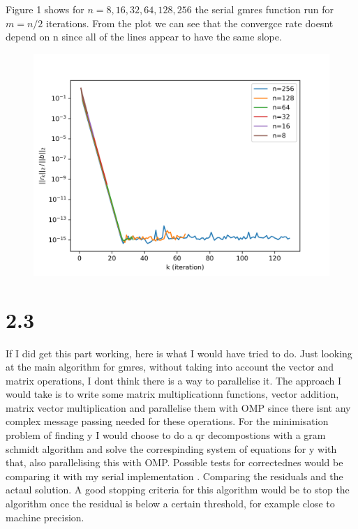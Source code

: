 \documentclass[a4paper]{article}
\begin{document}
	Figure 1 shows for $n = 8, 16, 32, 64, 128, 256$ the serial gmres function run
	for $m = n/2$ iterations. From the plot we can see that the convergce rate doesnt depend on n
	since all of the lines appear to have the same slope.
	\begin{figure}[h!]
	    \centering
    	\includegraphics[width=.8\linewidth]{./q2_fig.png}
		\caption{}
    	\label{fig:q2_fig}
	\end{figure}

\section*{2.3}
		
	If I did get this part working, here is what I would have tried to do. Just looking at the
	main algorithm for gmres, without taking into account the vector and matrix operations, I dont
	think there is a way to parallelise it. The approach I would take is to write some matrix 
	multiplicationn functions, vector addition, matrix vector multiplication and parallelise them 
	with OMP since there isnt any complex message passing needed for these operations. For the 
	minimisation problem of finding y I would choose to do a qr decompostions with a gram schmidt 
	algorithm and solve the correspinding system of equations for y with that, also parallelising 
	this with OMP. Possible tests for correctednes would be comparing it with my serial implementation
	. Comparing the residuals and the actaul solution. A good stopping criteria for this algorithm
	would be to stop the algorithm once the residual is below a certain threshold, for example close to
	machine precision.

 
 
\end{document}
